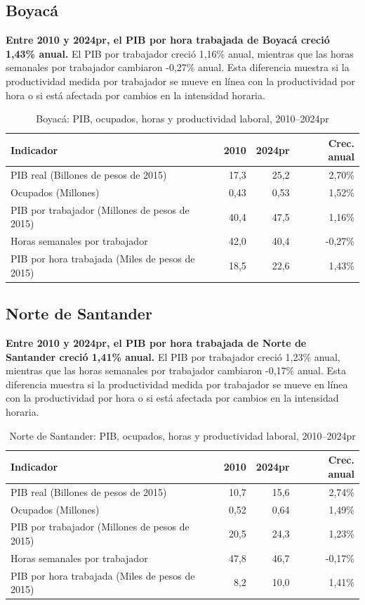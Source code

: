 \subsection{Boyacá}
\textbf{Entre 2010 y 2024pr, el PIB por hora trabajada de Boyacá creció 1,43\% anual.} El PIB por trabajador creció 1,16\% anual, mientras que las horas semanales por trabajador cambiaron -0,27\% anual. Esta diferencia muestra si la productividad medida por trabajador se mueve en línea con la productividad por hora o si está afectada por cambios en la intensidad horaria.
\begin{table}[H]
\centering
\caption{Boyacá: PIB, ocupados, horas y productividad laboral, 2010--2024pr}
\label{tab:departamento_boyaca_productividad}
\scriptsize
\begin{tabular}{lrrr}
\toprule
Indicador & 2010 & 2024pr & Crec. anual \\
\midrule
PIB real (Billones de pesos de 2015) & 17,3 & 25,2 & 2,70\% \\
Ocupados (Millones) & 0,43 & 0,53 & 1,52\% \\
PIB por trabajador (Millones de pesos de 2015) & 40,4 & 47,5 & 1,16\% \\
Horas semanales por trabajador & 42,0 & 40,4 & -0,27\% \\
PIB por hora trabajada (Miles de pesos de 2015) & 18,5 & 22,6 & 1,43\% \\
\bottomrule
\end{tabular}
\end{table}

\subsection{Norte de Santander}
\textbf{Entre 2010 y 2024pr, el PIB por hora trabajada de Norte de Santander creció 1,41\% anual.} El PIB por trabajador creció 1,23\% anual, mientras que las horas semanales por trabajador cambiaron -0,17\% anual. Esta diferencia muestra si la productividad medida por trabajador se mueve en línea con la productividad por hora o si está afectada por cambios en la intensidad horaria.
\begin{table}[H]
\centering
\caption{Norte de Santander: PIB, ocupados, horas y productividad laboral, 2010--2024pr}
\label{tab:departamento_norte_de_santander_productividad}
\scriptsize
\begin{tabular}{lrrr}
\toprule
Indicador & 2010 & 2024pr & Crec. anual \\
\midrule
PIB real (Billones de pesos de 2015) & 10,7 & 15,6 & 2,74\% \\
Ocupados (Millones) & 0,52 & 0,64 & 1,49\% \\
PIB por trabajador (Millones de pesos de 2015) & 20,5 & 24,3 & 1,23\% \\
Horas semanales por trabajador & 47,8 & 46,7 & -0,17\% \\
PIB por hora trabajada (Miles de pesos de 2015) & 8,2 & 10,0 & 1,41\% \\
\bottomrule
\end{tabular}
\end{table}

